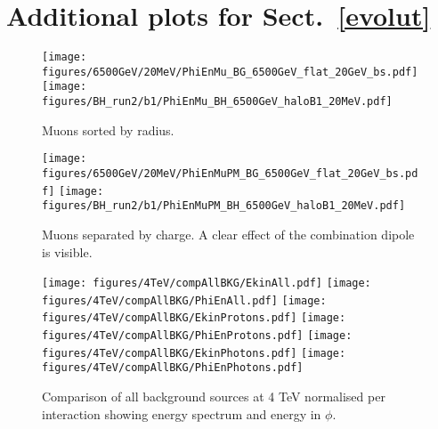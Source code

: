 \section{Additional plots for Sect.~\ref{evolut} \label{evolutApp}}
\begin{figure}
\begin{center}
  \texttt{[image: figures/6500GeV/20MeV/PhiEnMu\_BG\_6500GeV\_flat\_20GeV\_bs.pdf]}
  \texttt{[image: figures/BH\_run2/b1/PhiEnMu\_BH\_6500GeV\_haloB1\_20MeV.pdf]}      
\end{center}
\vspace{-0.6cm}
 \caption{Muons sorted by radius.
  \label{fig:PhiEnMu}}
\end{figure}



\begin{figure}
\begin{center}
  \texttt{[image: figures/6500GeV/20MeV/PhiEnMuPM\_BG\_6500GeV\_flat\_20GeV\_bs.pdf]}
    \texttt{[image: figures/BH\_run2/b1/PhiEnMuPM\_BH\_6500GeV\_haloB1\_20MeV.pdf]}            
\end{center}
\vspace{-0.6cm}
 \caption{Muons separated by charge. A clear effect of the combination dipole is visible. 
  \label{fig:PhiEnMuPM}}
\end{figure}



\begin{figure}
\begin{center}
  \texttt{[image: figures/4TeV/compAllBKG/EkinAll.pdf]}
  \texttt{[image: figures/4TeV/compAllBKG/PhiEnAll.pdf]}
  \texttt{[image: figures/4TeV/compAllBKG/EkinProtons.pdf]}
  \texttt{[image: figures/4TeV/compAllBKG/PhiEnProtons.pdf]}
  \texttt{[image: figures/4TeV/compAllBKG/EkinPhotons.pdf]}
  \texttt{[image: figures/4TeV/compAllBKG/PhiEnPhotons.pdf]}
\end{center}
\vspace{-0.6cm}
 \caption{Comparison of all background sources at 4 TeV normalised per interaction showing energy spectrum and energy in $\phi$.
  \label{fig:compAllBKG_perInt1}}
\end{figure}

